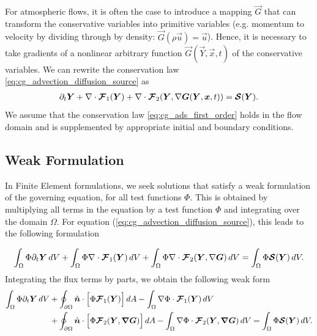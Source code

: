 \documentclass{report}
\numberwithin{equation}{section}
\begin{document}
For atmospheric flows, it is often the case to introduce a mapping $\vec{G}$ that can transform the conservative variables into
primitive variables (e.g. momentum to velocity by dividing through by density:
$\vec{G}(\rho \vec{u}) = \vec{u}$). Hence, it is necessary to take gradients of a nonlinear arbitrary function $\vec{G}(\vec Y, \vec x, t)$ of the conservative variables. 
We can rewrite the conservation law \eqref{eq:cg_advection_diffusion_source} as
\begin{align}
    \partial_t \boldsymbol{{Y}} 
    + \nabla \cdot \boldsymbol{{\mathcal{F}}}_1 (\boldsymbol{{Y}}) 
    + \nabla \cdot \boldsymbol{{\mathcal{F}}}_2 (\boldsymbol{{Y}}, \nabla \boldsymbol{{G}} (\boldsymbol{{Y}}, \boldsymbol{{x}}, t)) 
    = \boldsymbol{{\mathcal{S}}}(\boldsymbol{{Y}}).
    \label{eq:cg_ads_first_order}
\end{align}
We assume that the conservation law \eqref{eq:cg_ads_first_order} holds in the flow domain and is supplemented by appropriate initial and boundary conditions. 

\subsection{Weak Formulation}

In Finite Element formulations, we seek solutions that satisfy a weak formulation of the governing equation, for all test functions $\Phi$. This is obtained by multiplying all terms in the equation by a test function $\Phi$ and integrating over the domain $\Omega$. For equation (\ref{eq:cg_advection_diffusion_source}), this leads to the following formulation

\begin{equation}\label{eq:cg_weak-conservation-law}
    \int_\Omega \Phi \partial_t \boldsymbol{{Y}} \, dV
    + \int_\Omega \Phi \nabla \cdot \boldsymbol{{\mathcal{F}}}_1(\boldsymbol{{Y}}) \, dV 
    + \int_\Omega \Phi \nabla \cdot \boldsymbol{{\mathcal{F}}}_2(\boldsymbol{{Y}}, \nabla \boldsymbol{{G}}) \, dV
    = \int_\Omega \Phi \boldsymbol{{\mathcal{S}}}(\boldsymbol{{Y}}) \, dV.
\end{equation}
Integrating the flux terms by parts, we obtain the following weak form
\begin{align}\label{eq:cg_weak-conservation-law}
    \int_{\Omega} \Phi \partial_t \boldsymbol{{Y}} \, dV 
    & + \oint_{\partial \Omega} \hat {\boldsymbol{{n}}} \cdot \Big[ \Phi \boldsymbol{{\mathcal{F}}}_1(\boldsymbol{{Y}}) \Big] \, dA 
    - \int_{\Omega} \nabla \Phi \cdot \boldsymbol{{\mathcal{F}}}_1(\boldsymbol{{Y}}) \, dV  \nonumber \\
    & + \oint_{\partial \Omega} \hat {\boldsymbol{{n}}} \cdot \Big[ \Phi \boldsymbol{{\mathcal{F}}}_2(\boldsymbol{{Y}}, \boldsymbol{{\nabla}} \boldsymbol{{G}}) \Big] \, dA
    - \int_{\Omega} \nabla \Phi \cdot \boldsymbol{{\mathcal{F}}}_2(\boldsymbol{{Y}}, \boldsymbol{{\nabla}} \boldsymbol{{G}}) \, dV 
    =  \int_{\Omega} \Phi \boldsymbol{{\mathcal{S}}}(\boldsymbol{{Y}}) \, dV. 
\end{align}
\end{document}
